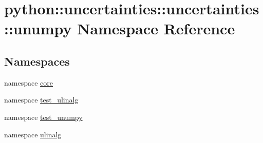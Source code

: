 \hypertarget{namespacepython_1_1uncertainties_1_1uncertainties_1_1unumpy}{
\section{python::uncertainties::uncertainties::unumpy Namespace Reference}
\label{namespacepython_1_1uncertainties_1_1uncertainties_1_1unumpy}
}
\subsection*{Namespaces}
\begin{DoxyCompactItemize}
\item 
namespace \hyperlink{namespacepython_1_1uncertainties_1_1uncertainties_1_1unumpy_1_1core}{core}
\item 
namespace \hyperlink{namespacepython_1_1uncertainties_1_1uncertainties_1_1unumpy_1_1test__ulinalg}{test\_\-ulinalg}
\item 
namespace \hyperlink{namespacepython_1_1uncertainties_1_1uncertainties_1_1unumpy_1_1test__unumpy}{test\_\-unumpy}
\item 
namespace \hyperlink{namespacepython_1_1uncertainties_1_1uncertainties_1_1unumpy_1_1ulinalg}{ulinalg}
\end{DoxyCompactItemize}
